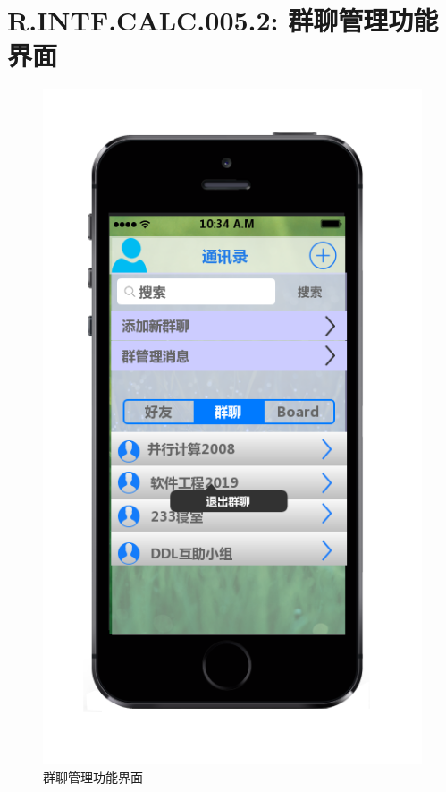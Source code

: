     \section{R.INTF.CALC.005.2: 群聊管理功能界面}
    \begin{figure}[h]
        \centering
        \includegraphics[scale=0.6]{OutlineDesign/figures/群聊管理功能界面.png}
        \caption{群聊管理功能界面}
        \label{fig:server_flow}
    \end{figure}
    \newpage
